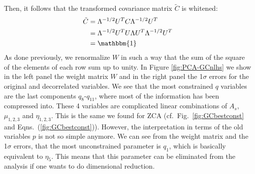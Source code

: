Then, it follows that the transformed covariance matrix $\tilde{C}$ is whitened:
\begin{align}
\tilde{C} & =\Lambda^{-1/2}U^{T}C\Lambda^{-1/2}U^{T}\\
& =\Lambda^{-1/2}U^{T}U\Lambda U^{T}\Lambda^{-1/2}U^{T}\\
& =\mathbbm{1}
\end{align}
As done previously, we renormalize $W$ in such a way that the sum of the square of the elements of each row sum up to
unity.
In Figure \ref{fig:PCA-GCnlhs} we show in the left panel the weight matrix $W$ and in the right panel the 1$\sigma$ errors for the original
and decorrelated variables. We see that the most constrained $q$ variables are the last components $q_8$-$q_{11}$, where most
of the information has been compressed into. These 4 variables are complicated linear combinations of $A_s$, $\mu_{1,2,3}$ 
and $\eta_{1,2,3}$. This is the same we found for ZCA (cf.\ Fig.\ \ref{fig:GCbestconst} and Eqns.\ (\ref{fig:GCbestconst})). However, the interpretation
in terms of the old variables $p$ is not so simple anymore. We can see from the weight matrix and the 1$\sigma$
errors, that the most unconstrained parameter is $q_1$, which is basically equivalent to $\eta_5$. This means that this parameter can be
eliminated from the analysis if one wants to do dimensional reduction.
